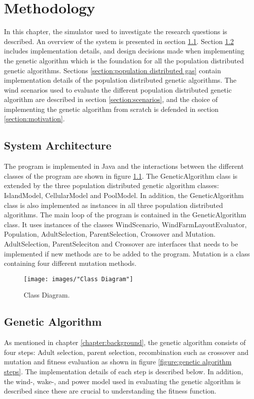 \chapter{Methodology}\label{chapter:methodology}%
In this chapter, the simulator used to investigate the research questions is described. An overview of the system is presented in section \ref{section:systemt architecture}. Section \ref{section:genetic algorithm} includes implementation details, and design decisions made when implementing the genetic algorithm which is the foundation for all the population distributed genetic algorithms. Sections \ref{section:population distributed gas} contain implementation details of the population distributed genetic algorithms. The wind scenarios used to evaluate the different population distributed genetic algorithm are described in section \ref{section:scenarios}, and the choice of implementing the genetic algorithm from scratch is defended in section \ref{section:motivation}.


\section{System Architecture}\label{section:systemt architecture}
The program is implemented in Java and the interactions between the different classes of the program are shown in figure \ref{figure:class diagram}. The GeneticAlgorithm class is extended by the three population distributed genetic algorithm classes: IslandModel, CellularModel and PoolModel. In addition, the GeneticAlgorithm class is also implemented as instances in all three population distributed algorithms. The main loop of the program is contained in the GeneticAlgorithm class. It uses instances of the classes WindScenario, WindFarmLayoutEvaluator, Population, AdultSelection, ParentSelection, Crossover and Mutation. AdultSelection, ParentSeleciton and Crossover are interfaces that needs to be implemented if new methods are to be added to the program. Mutation is a class containing four different mutation methods. 


\begin{figure}[h!]
\begin{center}
\texttt{[image: images/"Class Diagram"]}
\caption{Class Diagram.}
\label{figure:class diagram}
\end{center}
\end{figure}


\section{Genetic Algorithm}\label{section:genetic algorithm}
As mentioned in chapter \ref{chapter:background}, the genetic algorithm consists of four steps: Adult selection, parent selection, recombination such as crossover and mutation and fitness evaluation as shown in figure \ref{figure:genetic algorithm steps}. The implementation details of each step is described below. In addition, the wind-, wake-, and power model used in evaluating the genetic algorithm is described since these are crucial to understanding the fitness function. 



